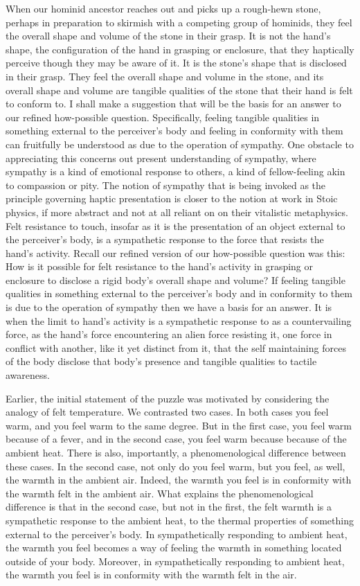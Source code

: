 \documentclass[12pt]{article}
\begin{document}
When our hominid ancestor reaches out and picks up a rough-hewn stone, perhaps in preparation to skirmish with a competing group of hominids, they feel the overall shape and volume of the stone in their grasp. It is not the hand's shape, the configuration of the hand in grasping or enclosure, that they haptically perceive though they may be aware of it. It is the stone's shape that is disclosed in their grasp. They feel the overall shape and volume in the stone, and its overall shape and volume are tangible qualities of the stone that their hand is felt to conform to. I shall make a suggestion that will be the basis for an answer to our refined how-possible question. Specifically, feeling tangible qualities in something external to the perceiver's body and feeling in conformity with them can fruitfully be understood as due to the operation of sympathy. One obstacle to appreciating this concerns out present understanding of sympathy, where sympathy is a kind of emotional response to others, a kind of fellow-feeling akin to compassion or pity. The notion of sympathy that is being invoked as the principle governing haptic presentation is closer to the notion at work in Stoic physics, if more abstract and not at all reliant on on their vitalistic metaphysics. Felt resistance to touch, insofar as it is the presentation of an object external to the perceiver's body, is a sympathetic response to the force that resists the hand's activity. Recall our refined version of our how-possible question was this: How is it possible for felt resistance to the hand's activity in grasping or enclosure to disclose a rigid body's overall shape and volume? If feeling tangible qualities in something external to the perceiver's body and in conformity to them is due to the operation of sympathy then we have a basis for an answer. It is when the limit to hand's activity is a sympathetic response to as a countervailing force, as the hand's force encountering an alien force resisting it, one force in conflict with another, like it yet distinct from it, that the self maintaining forces of the body disclose that body's presence and tangible qualities to tactile awareness.

Earlier, the initial statement of the puzzle was motivated by considering the analogy of felt temperature. We contrasted two cases. In both cases you feel warm, and you feel warm to the same degree. But in the first case, you feel warm because of a fever, and in the second case, you feel warm because because of the ambient heat. There is also, importantly, a phenomenological difference between these cases. In the second case, not only do you feel warm, but you feel, as well, the warmth in the ambient air. Indeed, the warmth you feel is in conformity with the warmth felt in the ambient air. What explains the phenomenological difference is that in the second case, but not in the first, the felt warmth is a sympathetic response to the ambient heat, to the thermal properties of something external to the perceiver's body. In sympathetically responding to ambient heat, the warmth you feel becomes a way of feeling the warmth in something located outside of your body. Moreover, in sympathetically responding to ambient heat, the warmth you feel is in conformity with the warmth felt in the air.
\end{document}
